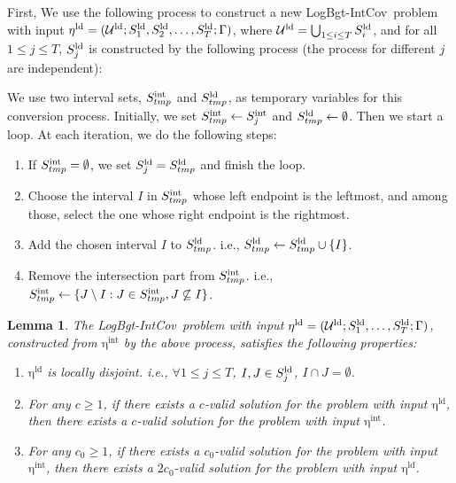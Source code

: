 \documentclass[11pt,a4paper]{article} \usepackage{enumitem}
\newcommand{\calU}{\mathcal{U}}
\newcommand{\LBOintcov}{\textsf{LogBgt-IntCov}}
\newcommand{\intS}[1]{\ifx\relax#1\relax
    S^{\operatorname{int}} \else
    S^{\operatorname{int}}_{#1} \fi
}
\newcommand{\inteta}{\operatorname{\eta^{int}}}
\newcommand{\ldU}{\operatorname{\calU^{ld}}}
\newcommand{\ldS}[1]{\ifx\relax#1\relax
    S^{\operatorname{ld}} \else
    S^{\operatorname{ld}}_{#1} \fi
}
\newcommand{\ldeta}{\operatorname{\eta^{ld}}}
\newtheorem{lemma}[theorem]{Lemma}
\theoremstyle{definition}
\begin{document}
First, We use the following process to construct a new \LBOintcov\ problem with input $\ldeta = (\ldU; \ldS{1}, \ldS{2}, \dots, \ldS{T}; \Gamma)$, where $\ldU = \bigcup_{1 \leq i \leq T} \ldS{i}$, and for all $1 \leq j \leq T$, $\ldS{j}$ is constructed by the following process (the process for different $j$ are independent):

We use two interval sets, $\intS{tmp}$ and $\ldS{tmp}$, as temporary variables for this conversion process. Initially, we set $\intS{tmp} \gets \intS{j}$ and $\ldS{tmp} \gets \emptyset$. Then we start a loop. At each iteration, we do the following steps:

\begin{enumerate}
\item If $\intS{tmp} = \emptyset$, we set $\ldS{j} = \ldS{tmp}$ and finish the loop.

\item Choose the interval $I$ in $\intS{tmp}$ whose left endpoint is the leftmost, and among those, select the one whose right endpoint is the rightmost.

\item Add the chosen interval $I$ to $\ldS{tmp}$. i.e., $\ldS{tmp} \gets \ldS{tmp} \cup \{I\}$.

\item Remove the intersection part from $\intS{tmp}$. i.e., $\intS{tmp} \gets \{J \setminus I : J \in \intS{tmp}, J \not\subseteq I\}$.
\end{enumerate}

\begin{lemma}\label{lem:inter-convert-1}
The \LBOintcov\ problem with input $\ldeta = (\ldU; \ldS{1}, \dots, \ldS{T}; \Gamma)$, constructed from $\inteta$ by the above process, satisfies the following properties:

\begin{enumerate}[label=(\alph*), format=\normalfont]

\item $\ldeta$ is locally disjoint. i.e., $\forall 1 \leq j \leq T$, $I, J \in \ldS{j}$, $I \cap J = \emptyset$.

\item For any $c \geq 1$, if there exists a $c$-valid solution for the problem with input $\ldeta$, then there exists a $c$-valid solution for the problem with input $\inteta$.

\item For any $c_0 \geq 1$, if there exists a $c_0$-valid solution for the problem with input $\inteta$, then there exists a $2c_0$-valid solution for the problem with input $\ldeta$.
\end{enumerate}
\end{lemma}
\end{document}
